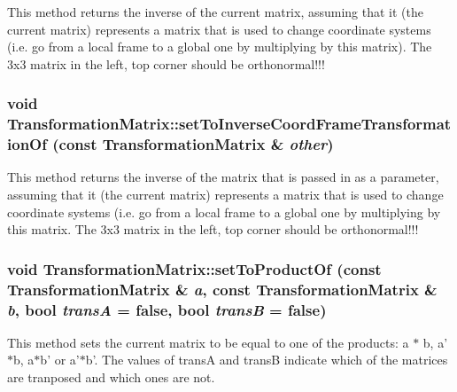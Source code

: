 This method returns the inverse of the current matrix, assuming that it (the current matrix) represents a matrix that is used to change coordinate systems (i.e. go from a local frame to a global one by multiplying by this matrix). The 3x3 matrix in the left, top corner should be orthonormal!!! \hypertarget{classCartWheel_1_1Math_1_1TransformationMatrix_a42020e7d7587084686f0cd5cc047cf90}{
\subsubsection[{setToInverseCoordFrameTransformationOf}]{\setlength{\rightskip}{0pt plus 5cm}void TransformationMatrix::setToInverseCoordFrameTransformationOf (const {\bf TransformationMatrix} \& {\em other})}}
\label{classCartWheel_1_1Math_1_1TransformationMatrix_a42020e7d7587084686f0cd5cc047cf90}
This method returns the inverse of the matrix that is passed in as a parameter, assuming that it (the current matrix) represents a matrix that is used to change coordinate systems (i.e. go from a local frame to a global one by multiplying by this matrix. The 3x3 matrix in the left, top corner should be orthonormal!!! \hypertarget{classCartWheel_1_1Math_1_1TransformationMatrix_acafb69b3be898884d38aa47e72b25d31}{
\subsubsection[{setToProductOf}]{\setlength{\rightskip}{0pt plus 5cm}void TransformationMatrix::setToProductOf (const {\bf TransformationMatrix} \& {\em a}, \/  const {\bf TransformationMatrix} \& {\em b}, \/  bool {\em transA} = {\ttfamily false}, \/  bool {\em transB} = {\ttfamily false})}}
\label{classCartWheel_1_1Math_1_1TransformationMatrix_acafb69b3be898884d38aa47e72b25d31}
This method sets the current matrix to be equal to one of the products: a $\ast$ b, a'$\ast$b, a$\ast$b' or a'$\ast$b'. The values of transA and transB indicate which of the matrices are tranposed and which ones are not.

